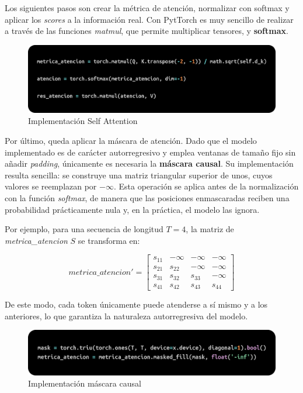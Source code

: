 \documentclass[11pt]{book}
\theoremstyle{plain}
\theoremstyle{definition}
\begin{document}
Los siguientes pasos son crear la métrica de atención, normalizar con softmax y aplicar los \textit{scores} a la información real. Con PytTorch es muy sencillo de realizar a través de las funciones \textit{matmul}, que permite multiplicar tensores, y \textbf{softmax}. 

\begin{figure}[h]
    \centering
    \includegraphics[width=0.5\linewidth]{img/atencion.png}
    \caption{Implementación Self Attention}
    \label{fig:placeholder9}
\end{figure}

Por último, queda aplicar la máscara de atención. Dado que el modelo implementado es de carácter autorregresivo y emplea ventanas de tamaño fijo sin añadir \textit{padding}, únicamente es necesaria la \textbf{máscara causal}. Su implementación resulta sencilla: se construye una matriz triangular superior de unos, cuyos valores se reemplazan por $-\infty$. Esta operación se aplica antes de la normalización con la función \textit{softmax}, de manera que las posiciones enmascaradas reciben una probabilidad prácticamente nula y, en la práctica, el modelo las ignora.  

Por ejemplo, para una secuencia de longitud $T=4$, la matriz de \textit{metrica\_atencion} $S$ se transforma en:  

\[
metrica\_atencion' =
\begin{bmatrix}
s_{11} & -\infty & -\infty & -\infty \\
s_{21} & s_{22} & -\infty & -\infty \\
s_{31} & s_{32} & s_{33} & -\infty \\
s_{41} & s_{42} & s_{43} & s_{44}
\end{bmatrix}
\]

De este modo, cada token únicamente puede atenderse a sí mismo y a los anteriores, lo que garantiza la naturaleza autorregresiva del modelo.

\begin{figure}[h]
    \centering
    \includegraphics[width=0.5\linewidth]{img/masked.png}
    \caption{Implementación máscara causal}
    \label{fig:placeholder10}
\end{figure}
\end{document}
